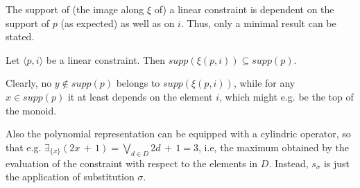 \documentclass{llncs}
\begin{document}
\begin{example}
{The support of (the image along $\xi$ of) a linear constraint is dependent on the support of $p$ (as expected)
as well as on $i$.
%
%
Thus, only a minimal result can be stated.

\begin{lemma}[Support]
Let $\langle p, i \rangle$ be a linear constraint. Then $supp(\xi(p,i)) \subseteq supp(p)$.
\end{lemma}

Clearly, no $y \not \in supp(p)$ belongs to $supp(\xi(p,i))$,
%
while for any $x \in supp(p)$ it at least depends on the element 
$i$, which might e.g. be the top of the monoid.
}
\medskip
	Also the polynomial representation can be equipped with a cylindric operator, so that
	e.g. $\exists_{ \{x \} }(2x \, + \, 1) = \bigvee_{d \in D} 2d\, + \, 1 = 3$, i.e,
	the maximum obtained by the evaluation of the constraint with respect 
	to the elements in $D$.
	Instead, $s_\sigma$ is just the application of substitution $\sigma$.
%	
\end{example}
\end{document}
